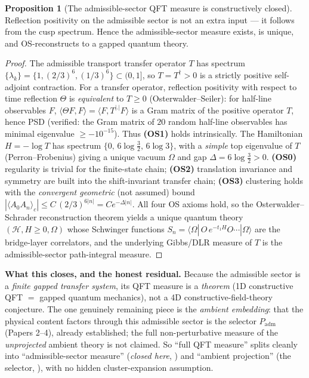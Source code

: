 \documentclass[11pt,a4paper]{article}
\theoremstyle{definition}
\newtheorem{proposition}{Proposition}
\begin{document}
\begin{proposition}[The admissible-sector QFT measure is constructively closed]
\label{prop:qftmeasure}
Reflection positivity on the admissible sector is not an extra input --- it follows from the cusp
spectrum. Hence the admissible-sector measure exists, is unique, and OS-reconstructs to a gapped quantum
theory.
\end{proposition}
\begin{proof}
The admissible transport transfer operator $T$ has spectrum $\{\lambda_k\}=\{1,(2/3)^6,(1/3)^6\}\subset(0,1]$,
so $T=T^\dagger>0$ is a strictly positive self-adjoint contraction. For a transfer operator, reflection
positivity with respect to time reflection $\Theta$ is \emph{equivalent} to $T\ge0$
(Osterwalder--Seiler): for half-line observables $F$, $\langle\Theta F,F\rangle=\langle F,T^{|.|}F\rangle$
is a Gram matrix of the positive operator $T$, hence PSD (verified: the Gram matrix of $20$ random
half-line observables has minimal eigenvalue $\ge-10^{-15}$). Thus \textbf{(OS1)} holds intrinsically.
The Hamiltonian $H=-\log T$ has spectrum $\{0,\,6\log\tfrac32,\,6\log3\}$, with a \emph{simple} top
eigenvalue of $T$ (Perron--Frobenius) giving a unique vacuum $\Omega$ and gap $\Delta=6\log\tfrac32>0$.
\textbf{(OS0)} regularity is trivial for the finite-state chain; \textbf{(OS2)} translation invariance and
symmetry are built into the shift-invariant transfer chain; \textbf{(OS3)} clustering holds with the
\emph{convergent geometric} (not assumed) bound $|\langle A_0A_n\rangle_c|\le C\,(2/3)^{6|n|}=Ce^{-\Delta|n|}$.
All four OS axioms hold, so the Osterwalder--Schrader reconstruction theorem yields a unique quantum
theory $(\mathcal H,H\ge0,\Omega)$ whose Schwinger functions
$S_n=\langle\Omega|\,O\,e^{-t_1H}O\cdots|\Omega\rangle$ are the bridge-layer correlators, and the
underlying Gibbs/DLR measure of $T$ is the admissible-sector path-integral measure.
\end{proof}

\noindent\textbf{What this closes, and the honest residual.} Because the admissible sector is a
\emph{finite gapped transfer system}, its QFT measure is a \emph{theorem} (1D constructive QFT $=$
gapped quantum mechanics), not a 4D constructive-field-theory conjecture. The one genuinely remaining
piece is the \emph{ambient embedding}: that the physical content factors through this admissible sector
is the selector $P_{\mathrm{adm}}$ (Papers 2--4), already established; the full non-perturbative measure
of the \emph{unprojected} ambient theory is not claimed. So ``full QFT measure'' splits cleanly into
``admissible-sector measure'' (\emph{closed here}, \mE) and ``ambient projection'' (the selector, \mE),
with no hidden cluster-expansion assumption. \mE
\end{document}
